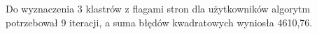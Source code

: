 \documentclass{classrep}
\begin{document}
    
    
    Do wyznaczenia 3 klastrów z flagami stron dla użytkowników algorytm potrzebował 9 iteracji, a suma błędów kwadratowych wyniosła 4610,76.
\end{document}
